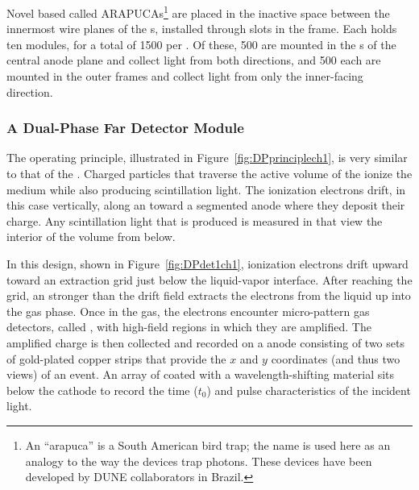 Novel  based  called ARAPUCAs\footnote{An ``arapuca'' is a South American bird trap; the name is used here as an analogy to the way the devices trap photons. These devices have been developed by DUNE collaborators in Brazil.}
 are placed in the inactive space between the innermost wire planes of the s, installed through slots in the  frame. 
Each  holds ten  modules, for a total of \num{1500} per .  Of these, \num{500} are mounted in the s of the central anode plane and collect light from both directions, 
and \num{500} each are mounted in the outer  frames and collect light from only the inner-facing direction. 

\FloatBarrier
\subsubsection{A Dual-Phase Far Detector Module}
\label{sec:fddp-exec-splar}

The  operating principle, illustrated in Figure~\ref{fig:DPprinciplech1}, is very similar to that of the . %
 Charged particles that traverse the active volume of the  ionize the medium while also producing scintillation light.  The ionization electrons drift, in this case vertically, along an \efield toward a segmented anode where they deposit their charge. Any scintillation light that is produced is measured in   that view the interior of the volume from below. 
 
 In this design, shown in Figure~\ref{fig:DPdet1ch1}, ionization electrons drift upward toward an extraction grid just below the liquid-vapor interface. 
After reaching the grid, an \efield stronger than the \dpnominaldriftfield{} drift field extracts the electrons from the liquid up into the gas phase. Once in the gas, the electrons encounter micro-pattern gas detectors, called , with high-field regions
in which they are amplified. 
The amplified charge is then collected and recorded on a \twod anode
consisting of two sets of %
gold-plated copper strips that provide the $x$ and $y$ coordinates (and thus two views) of an event. 
An array of  coated with a wavelength-shifting material sits below the cathode to record the time ($t_{0}$) and pulse characteristics of the incident light.


